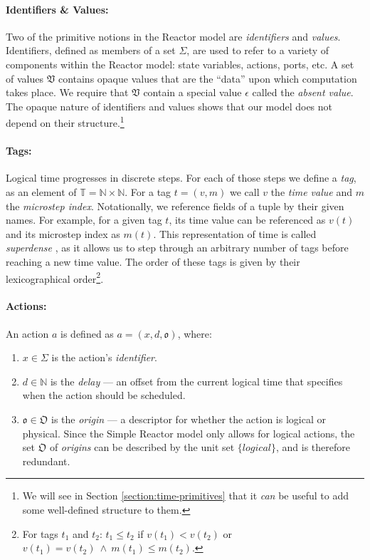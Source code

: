 \paragraph{Identifiers \& Values:}

Two of the primitive notions in the Reactor model are \emph{identifiers} and \emph{values}.
Identifiers, defined as members of a set $\Sigma$, are used to refer to a variety of components within the Reactor model: state variables, actions, ports, etc.
A set of values $\mathfrak{V}$ contains opaque values that are the ``data'' upon which computation takes place.
We require that $\mathfrak{V}$ contain a special value $\epsilon$ called the \emph{absent value}.
The opaque nature of identifiers and values shows that our model does not depend on their structure.\footnote{ 
  We will see in Section \ref{section:time-primitives} that it \emph{can} be useful to add some well-defined structure to them.
}

\paragraph{Tags:} 

Logical time progresses in discrete steps. 
For each of those steps we define a \emph{tag}, as an element of $\mathbb{T} = \mathbb{N} \times \mathbb{N}$.
For a tag $t = (v, m)$ we call $v$ the \emph{time value} and $m$ the \emph{microstep index}.
Notationally, we reference fields of a tuple by their given names. 
For example, for a given tag $t$, its time value can be referenced as $v(t)$ and its microstep index as $m(t)$.
This representation of time is called \emph{superdense} \cite{dense}, as it allows us to step through an arbitrary number of tags before reaching a new time value.
The order of these tags is given by their lexicographical order\footnote{
    For tags $t_1$ and $t_2$: $t_1 \leq t_2$ if $v(t_1) < v(t_2)$ or $v(t_1) = v(t_2)\ \wedge\ m(t_1) \leq m(t_2)$.
}.

\paragraph{Actions:} 

An action $a$ is defined as $a = (x, d, \mathfrak{o})$, where:

\begin{enumerate}
    \item $x \in \Sigma$ is the action's \emph{identifier}.
    \item $d \in \mathbb{N}$ is the \emph{delay} --- an offset from the current logical time that specifies when the action should be scheduled.
    \item $\mathfrak{o} \in \mathfrak{O}$ is the \emph{origin} --- a descriptor for whether the action is logical or physical.
    Since the Simple Reactor model only allows for logical actions, the set $\mathfrak{O}$ of \emph{origins} can be described by the unit set $\{logical\}$, and is therefore redundant.
\end{enumerate}

